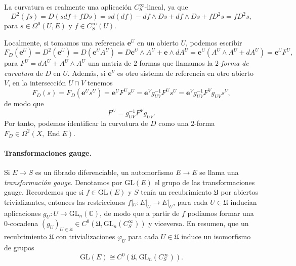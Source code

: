\documentclass[12pt,a4paper]{article}
\theoremstyle{definition} \newtheorem{defn}[thm]{Definición}
\theoremstyle{definition} \newtheorem{ejemplo}[thm]{Ejemplo}
\theoremstyle{definition} \newtheorem{ejercicio}[thm]{Ejercicio}
\def\CC{\mathbb{C}}
\def\UU{\mathfrak{U}}
\def\GL{\mathrm{GL}}
\DeclareMathOperator{\End}{End}
\begin{document}
	  La curvatura es realmente una aplicación $C^\infty_S$-lineal, ya que
	  \begin{equation*}
	    D^2(fs) = D(s df + fDs) = s d(df) -df \wedge Ds + df\wedge Ds + f D^2 s = f D^2s,
	  \end{equation*}
	  para $s\in \Omega^0(U,E)$ y $f\in C^\infty_S(U)$.

	  Localmente, si tomamos una referencia $\mathbf{e}^U$ en un abierto $U$, podemos escribir
	  \begin{equation*}
	    F_D(\mathbf{e}^U)= D^2(\mathbf{e}^U) = D(\mathbf{e}^U A^U) = D\mathbf{e}^U \wedge A^U + \mathbf{e} \wedge dA^U = \mathbf{e}^U (A^U \wedge A^U + dA^U) = \mathbf{e}^U F^U,
	  \end{equation*}
	  para $F^U = dA^U + A^U \wedge A^U$ una matriz de $2$-formas que llamamos la \emph{$2$-forma de curvatura} de $D$ en $U$. Además, si $\mathbf{e}^V$ es otro sistema de referencia en otro abierto $V$, en la intersección $U\cap V$ tenemos
	  \begin{equation*}
	    F_D(s)=   F_D (\mathbf{e}^U s^U) = \mathbf{e}^U F^U s^U = \mathbf{e}^V g_{UV}^{-1} F^U s^U = \mathbf{e}^V g_{UV}^{-1} F^V g_{UV} s^V,      
	  \end{equation*}
	  de modo que
	  \begin{equation*}
	    F^U = g_{UV}^{-1} F^V g_{UV}.
	  \end{equation*}
	  Por tanto, podemos identificar la curvatura de $D$ como una $2$-forma $F_D \in \Omega^2(X,\End E)$.

	  \paragraph{Transformaciones gauge.} Si $E\rightarrow S$ es un fibrado diferenciable, un automorfismo $E\rightarrow E$ se llama una \emph{transformación gauge}. Denotamos por $\GL(E)$ el grupo de las transformaciones gauge. Recordemos que si $f\in \GL(E)$ y $S$ tenía un recubrimiento $\UU$ por abiertos trivializantes, entonces las restricciones $f|_U:E|_U \rightarrow E|_U$, para cada $U\in \UU$ inducían aplicaciones $g_U:U\rightarrow \GL_n(\CC)$, de modo que a partir de $f$ podíamos formar una $0$-cocadena $(g_U)_{U\in \UU} \in C^0(\UU,\GL_n(C^\infty_S))$ y viceversa. En resumen, que un recubrimiento $\UU$ con trivializaciones $\varphi_U$ para cada $U\in \UU$ induce un isomorfismo de grupos
	  \begin{equation*}
	    \GL(E) \cong C^0(\UU,\GL_n(C^\infty_S)).
	  \end{equation*}
\end{document}
